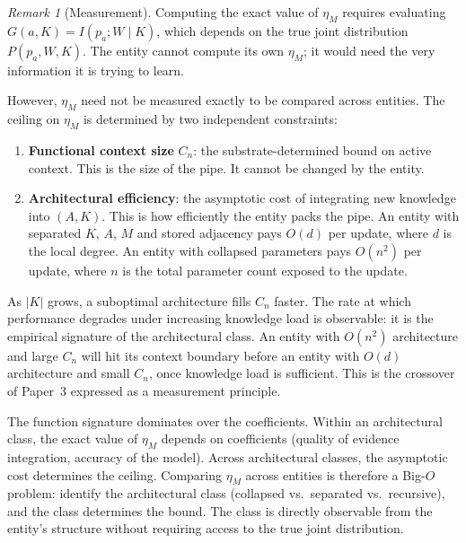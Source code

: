 \documentclass[11pt]{article}
\theoremstyle{definition}
\theoremstyle{remark}
\newtheorem{remark}{Remark}
\begin{document}
\begin{remark}[Measurement]
\label{rem:measurement}
Computing the exact value of $\eta_M$ requires evaluating
$G(a, K) = I(p_a; W \mid K)$, which depends on the true joint
distribution $P(p_a, W, K)$. The entity cannot compute its own
$\eta_M$; it would need the very information it is trying to learn.

However, $\eta_M$ need not be measured exactly to be compared across
entities. The ceiling on $\eta_M$ is determined by two independent
constraints:

\begin{enumerate}
\item \textbf{Functional context size} $C_n$: the substrate-determined
   bound on active context. This is the size of the pipe. It cannot be
   changed by the entity.

\item \textbf{Architectural efficiency}: the asymptotic cost of
   integrating new knowledge into $(A, K)$. This is how efficiently
   the entity packs the pipe. An entity with separated $K$, $A$, $M$
   and stored adjacency pays $O(d)$ per update, where $d$ is the
   local degree. An entity with collapsed parameters pays $O(n^2)$
   per update, where $n$ is the total parameter count exposed to the
   update.
\end{enumerate}

As $|K|$ grows, a suboptimal architecture fills $C_n$ faster. The
rate at which performance degrades under increasing knowledge load is
observable: it is the empirical signature of the architectural class.
An entity with $O(n^2)$ architecture and large $C_n$ will hit its
context boundary before an entity with $O(d)$ architecture and small
$C_n$, once knowledge load is sufficient. This is the crossover of
Paper~3 \cite{McCarthy2026c} expressed as a measurement principle.

The function signature dominates over the coefficients. Within an
architectural class, the exact value of $\eta_M$ depends on
coefficients (quality of evidence integration, accuracy of the model).
Across architectural classes, the asymptotic cost determines the
ceiling. Comparing $\eta_M$ across entities is therefore a Big-$O$
problem: identify the architectural class (collapsed vs.\ separated
vs.\ recursive), and the class determines the bound. The class is
directly observable from the entity's structure without requiring
access to the true joint distribution.
\end{remark}
\end{document}
